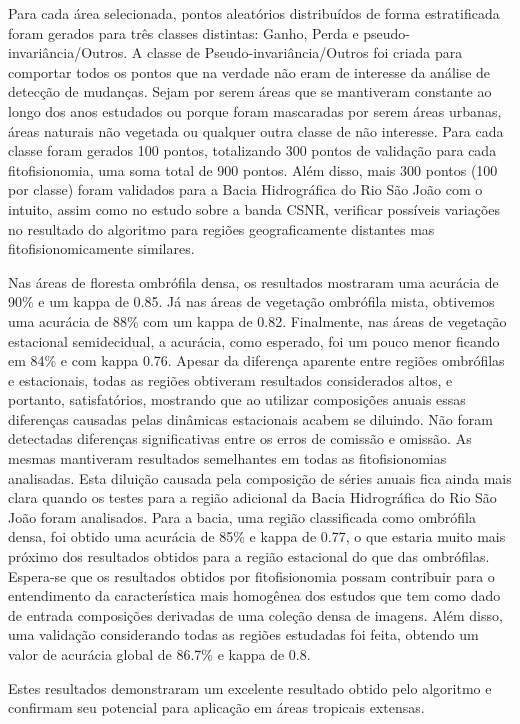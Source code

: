 Para cada área selecionada, pontos aleatórios distribuídos de forma estratificada foram gerados para três classes distintas: Ganho, Perda e  pseudo-invariância/Outros. A classe de Pseudo-invariância/Outros foi criada para comportar todos os pontos que na verdade não eram de interesse da análise de detecção de mudanças. Sejam por serem áreas que se mantiveram constante ao longo dos anos estudados ou porque foram mascaradas por serem áreas urbanas, áreas naturais não vegetada ou qualquer outra classe de não interesse. Para cada classe foram gerados 100 pontos, totalizando 300 pontos de validação para cada fitofisionomia, uma soma total de 900 pontos. Além disso, mais 300 pontos (100 por classe) foram validados para a Bacia Hidrográfica do Rio São João com o intuito, assim como no estudo sobre a banda CSNR, verificar possíveis variações no resultado do algoritmo para regiões geograficamente distantes mas fitofisionomicamente similares.

Nas áreas de floresta ombrófila densa, os resultados mostraram uma acurácia de 90\% e um kappa de 0.85. Já nas áreas de vegetação ombrófila mista, obtivemos uma acurácia de 88\% com um kappa de 0.82. Finalmente, nas áreas de vegetação estacional semidecidual, a acurácia, como esperado, foi um pouco menor ficando em 84\% e com kappa 0.76. Apesar da diferença aparente entre regiões ombrófilas e estacionais, todas as regiões obtiveram resultados considerados altos, e portanto, satisfatórios, mostrando que ao utilizar composições anuais essas diferenças causadas pelas dinâmicas estacionais acabem se diluindo. Não foram detectadas diferenças significativas entre os erros de comissão e omissão. As mesmas mantiveram resultados semelhantes em todas as fitofisionomias analisadas.  
Esta diluição causada pela composição de séries anuais fica ainda mais clara quando os testes para a região adicional da Bacia Hidrográfica do Rio São João foram analisados. Para a bacia, uma região classificada como ombrófila densa, foi obtido uma acurácia de 85\% e kappa de 0.77, o que estaria muito mais próximo dos resultados obtidos para a região estacional do que das ombrófilas. Espera-se que os resultados obtidos por fitofisionomia possam contribuir para o entendimento da característica mais homogênea dos estudos que tem como dado de entrada composições derivadas de uma coleção densa de imagens. Além disso, uma validação considerando todas as regiões estudadas foi feita, obtendo um valor de acurácia global de 86.7\% e kappa de 0.8. 

Estes resultados demonstraram um excelente resultado obtido pelo algoritmo e confirmam seu potencial para aplicação em áreas tropicais extensas.

